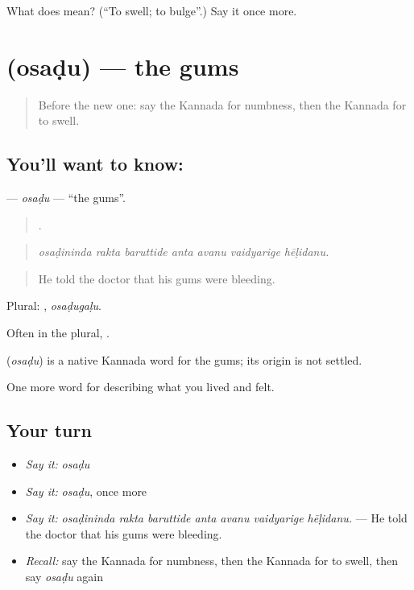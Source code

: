 \begin{tcolorbox}[breakable,colback=teal!4,colframe=teal!35!black,title={Before you move on}]
What does  mean? (\textquotedblleft{}To swell; to bulge\textquotedblright{}.) Say it once more.
\end{tcolorbox}
\section[\texorpdfstring{\kn{ಒಸಡು} (osaḍu)}{ಒಸಡು (osaḍu)}]{ (osaḍu) — the gums}

\label{lesson:KA-C510-osadu}



\begin{quote}
Before the new one: say the Kannada for numbness, then the Kannada for to swell.
\end{quote}

\subsection*{You'll want to know: }
\textbf{} — \emph{osaḍu} — \textquotedblleft{}the gums\textquotedblright{}.

\begin{quote}
      .
\end{quote}

\begin{quote}
\emph{osaḍininda rakta baruttide anta avanu vaidyarige hēḷidanu.}
\end{quote}

\begin{quote}
He told the doctor that his gums were bleeding.
\end{quote}

Plural: , \emph{osaḍugaḷu}.

Often in the plural, .

\begin{cousinweb}
\textbf{} (\emph{osaḍu}) is a native Kannada word for the gums; its origin is not settled.
\end{cousinweb}

\begin{grammarlens}[title={What you've built}]
One more word for describing what you lived and felt.
\end{grammarlens}

\subsection*{Your turn}
\begin{itemize}
\raggedright
  \item \emph{Say it:} \emph{osaḍu}
  \item \emph{Say it:} \emph{osaḍu}, once more
  \item \emph{Say it:} \emph{osaḍininda rakta baruttide anta avanu vaidyarige hēḷidanu.} — He told the doctor that his gums were bleeding.
  \item \emph{Recall:} say the Kannada for numbness, then the Kannada for to swell, then say \emph{osaḍu} again
\end{itemize}

